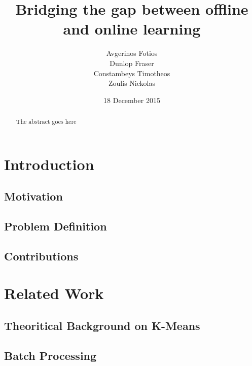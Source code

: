 \documentclass{lmproj}
\begin{document}
\title{Bridging the gap between offline and online learning}
\author{Avgerinos Fotios \\
        Dunlop Fraser \\
        Constambeys Timotheos \\
        Zoulis Nickolas}
\date{18 December 2015}
\maketitle
\begin{abstract}

The abstract goes here

\end{abstract}
\educationalconsent
\tableofcontents
\chapter{Introduction}
\label{intro}

\section{Motivation}
\label{intro}

\section{Problem Definition}
\label{intro}

\section{Contributions}
\label{intro}

\chapter{Related Work}
\label{relatedwork}

\section{Theoritical Background on K-Means}
\label{relatedwork}

\section{Batch Processing}
\label{relatedwork}
\end{document}
